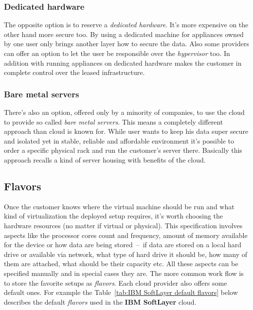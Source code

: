 \subsubsection{Dedicated hardware}
\label{subs:Dedicated hardware}

The opposite option is to reserve a \emph{dedicated hardware}. It's more expensive on the other hand more secure too. By using a dedicated machine for appliances owned by one user only brings another layer how to secure the data. Also some providers can offer an option to let the user be responsible over the \emph{hypervisor} too. In addition with running appliances on dedicated hardware makes the customer in complete control over the leased infrastructure.

\subsubsection{Bare metal servers}
\label{subs:Bare metal servers}

There's also an option, offered only by a minority of companies, to use the cloud to provide so called \emph{bare metal servers}. This means a completely different approach than cloud is known for. While user wants to keep his data super secure and isolated yet in stable, reliable and affordable environment it's possible to order a specific physical rack and run the customer's server there. Basically this approach recalls a kind of server housing with benefits of the cloud.

\subsection{Flavors}
\label{sub:Flavors}

Once the customer knows where the virtual machine should be run and what kind of virtualization the deployed setup requires, it's worth choosing the hardware resources (no matter if virtual or physical). This specification involves aspects like the processor cores count and frequency, amount of memory available for the device or how data are being stored \,--\, if data are stored on a local hard drive or available via network, what type of hard drive it should be, how many of them are attached, what should be their capacity etc. All these aspects can be specified manually and in special cases they are. The more common work flow is to store the favorite setups as \emph{flavors}. Each cloud provider also offers some default ones. For example the Table~\ref{tab:IBM SoftLayer default flavors} below describes the default \emph{flavors} used in the \textbf{IBM SoftLayer} cloud.


